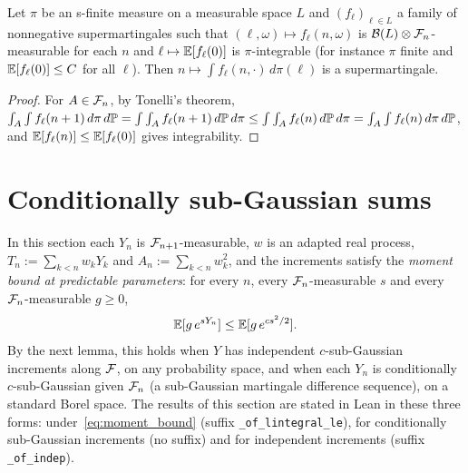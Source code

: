 \begin{lemma}
  \label{lem:supermartingale_integral}
  \leanok
  Let $\pi$ be an s-finite measure on a measurable space $L$ and $(f_\ell)_{\ell \in L}$ a family of
  nonnegative supermartingales such that $(\ell, \omega) \mapsto f_\ell(n, \omega)$ is
  $\mathcal B(L) \otimes \mathcal{F}_n$-measurable for each $n$ and $\ell \mapsto \mathbb{E}[f_\ell(0)]$ is
  $\pi$-integrable (for instance $\pi$ finite and $\mathbb{E}[f_\ell(0)] \le C$ for all $\ell$). Then
  $n \mapsto \int f_\ell(n, \cdot)\, d\pi(\ell)$ is a supermartingale.
\end{lemma}

\begin{proof}
  \leanok
  For $A \in \mathcal{F}_n$, by Tonelli's theorem,
  $\int_A \int f_\ell(n+1) \, d\pi \, d\mathbb{P} = \int \int_A f_\ell(n+1) \, d\mathbb{P} \, d\pi \le \int
  \int_A f_\ell(n) \, d\mathbb{P} \, d\pi = \int_A \int f_\ell(n) \, d\pi \, d\mathbb{P}$, and
  $\mathbb{E}[f_\ell(n)] \le \mathbb{E}[f_\ell(0)]$ gives integrability.
\end{proof}

\section{Conditionally sub-Gaussian sums}

In this section each $Y_n$ is $\mathcal{F}_{n+1}$-measurable, $w$ is an adapted real process,
$T_n := \sum_{k<n} w_k Y_k$ and $A_n := \sum_{k<n} w_k^2$, and the increments satisfy the
\emph{moment bound at predictable parameters}: for every $n$, every $\mathcal{F}_n$-measurable $s$ and every
$\mathcal{F}_n$-measurable $g \ge 0$,
\begin{equation}
  \label{eq:moment_bound}
  \mathbb{E}[g \, e^{s Y_n}] \le \mathbb{E}[g \, e^{c s^2 / 2}].
\end{equation}
By the next lemma, this holds when $Y$ has independent $c$-sub-Gaussian increments along $\mathcal{F}$, on
any probability space, and when each $Y_n$ is conditionally $c$-sub-Gaussian given $\mathcal{F}_n$ (a
sub-Gaussian martingale difference sequence), on a standard Borel space. The results of this
section are stated in Lean in these three forms: under~\eqref{eq:moment_bound} (suffix
\texttt{\_of\_lintegral\_le}), for conditionally sub-Gaussian increments (no suffix) and for
independent increments (suffix \texttt{\_of\_indep}).

